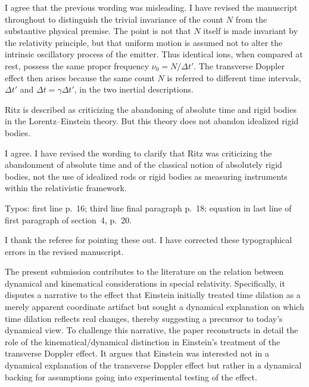 \documentclass[submitted,11pt]{article}
\begin{document}
\begin{reply}
I agree that the previous wording was misleading. I have revised the manuscript throughout to distinguish the trivial invariance of the count $N$ from the substantive physical premise. The point is not that $N$ itself is made invariant by the relativity principle, but that uniform motion is assumed not to alter the intrinsic oscillatory process of the emitter. Thus identical ions, when compared at rest, possess the same proper frequency $\nu_0=N/\Delta t'$. The transverse Doppler effect then arises because the same count $N$ is referred to different time intervals, $\Delta t'$ and $\Delta t=\gamma\Delta t'$, in the two inertial descriptions.
\end{reply}

\begin{point}
Ritz is described as criticizing the abandoning of absolute time and rigid bodies in the Lorentz--Einstein theory. But this theory does not abandon idealized rigid bodies.
\end{point}

\begin{reply}
I agree. I have revised the wording to clarify that Ritz was criticizing the abandonment of absolute time and of the classical notion of absolutely rigid bodies, not the use of idealized rods or rigid bodies as measuring instruments within the relativistic framework.
\end{reply}

\begin{point}
Typos: first line p.~16; third line final paragraph p.~18; equation in last line of first paragraph of section~4, p.~20.
\end{point}

\begin{reply}
I thank the referee for pointing these out. I have corrected these typographical errors in the revised manuscript.
\end{reply}


\reviewersection

The present submission contributes to the literature on the relation between
dynamical and kinematical considerations in special relativity.  Specifically,
it disputes a narrative to the effect that Einstein initially treated time
dilation as a merely apparent coordinate artifact but sought a dynamical
explanation on which time dilation reflects real changes, thereby suggesting a
precursor to today's dynamical view.  To challenge this narrative, the paper
reconstructs in detail the role of the kinematical/dynamical distinction in
Einstein's treatment of the transverse Doppler effect.  It argues that Einstein
was interested not in a dynamical explanation of the transverse Doppler effect
but rather in a dynamical backing for assumptions going into experimental
testing of the effect.  
\end{document}
